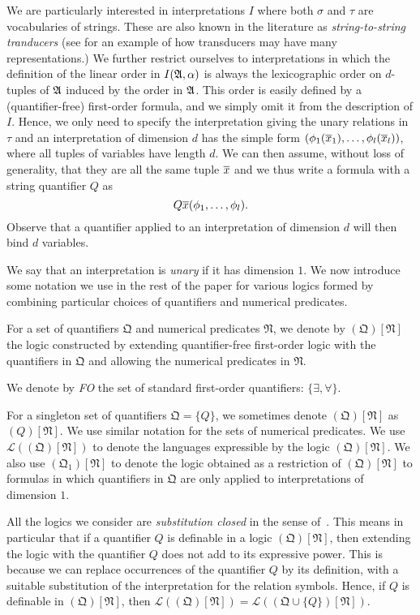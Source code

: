 \documentclass[a4paper,UKenglish,cleveref, autoref, thm-restate, anonymous]{lipics-v2021}
\begin{document}
We are particularly interested in interpretations $I$ where both $\sigma$ and $\tau$ are vocabularies of strings.  These are also known in the literature as \emph{string-to-string tranducers} (see \cite{bojanczyk2022transducers} for an example of how transducers may have many representations.)  We further restrict ourselves to interpretations in which the definition of the linear order in $I(\mathfrak{A},\alpha)$ is always the lexicographic order on $d$-tuples of $\mathfrak{A}$ induced by the order in $\mathfrak{A}$.  This order is easily defined by a (quantifier-free) first-order formula, and we simply omit it from the description of $I$.  Hence, we only need to specify the interpretation giving the unary relations in $\tau$ and an interpretation of dimension $d$ has the simple form $(\phi_1(\overline{x}_1),\ldots, \phi_l(\overline{x}_l))$, where all tuples of variables have length $d$.  We can then assume, without loss of generality, that they are all the same tuple $\overline{x}$ and we thus write a formula with a string quantifier $Q$ as
$$Q \overline{x} (\phi_1,\ldots,\phi_l).$$
Observe that a quantifier applied to an interpretation of dimension $d$ will then bind $d$ variables.

We say that an interpretation is \emph{unary} if it has dimension $1$.  We now introduce some notation we use in the rest of the paper for various logics formed by combining particular choices of quantifiers and numerical predicates.
\begin{definition}
  For a set of quantifiers $\mathfrak{Q}$ and numerical predicates $\mathfrak{N}$, we denote by $(\mathfrak{Q})[\mathfrak{N}]$ the logic constructed by extending quantifier-free first-order logic with the quantifiers in $\mathfrak{Q}$ and allowing the numerical predicates in $\mathfrak{N}$.

   We denote by \emph{FO} the set of standard first-order quantifiers: $\{\exists, \forall\}$.
\end{definition}
For a singleton set of quantifiers $\mathfrak{Q} = \{Q\}$, we sometimes denote $(\mathfrak{Q})[\mathfrak{N}]$ as $(Q)[\mathfrak{N}]$. We use similar notation for the sets of numerical predicates. We use $\mathcal{L}((\mathfrak{Q})[\mathfrak{N}])$ to denote the languages expressible by the logic $(\mathfrak{Q})[\mathfrak{N}]$.  We also use $(\mathfrak{Q}_1)[\mathfrak{N}]$ to denote the logic obtained as a restriction of $(\mathfrak{Q})[\mathfrak{N}]$ to formulas in which quantifiers in $\mathfrak{Q}$ are only applied to interpretations of dimension $1$.

All the logics we consider are \emph{substitution closed} in the sense of~\cite{Ebb85}.  This means in particular that if a quantifier $Q$ is definable in a logic $(\mathfrak{Q})[\mathfrak{N}]$, then extending the logic with the quantifier $Q$ does not add to its expressive power.  This is because we can replace occurrences of the quantifier $Q$ by its definition, with a suitable substitution of the interpretation for the relation symbols.  Hence, if $Q$ is definable in $(\mathfrak{Q})[\mathfrak{N}]$, then $\mathcal{L}((\mathfrak{Q})[\mathfrak{N}]) = \mathcal{L}((\mathfrak{Q} \cup \{Q\})[\mathfrak{N}])$.
\end{document}
